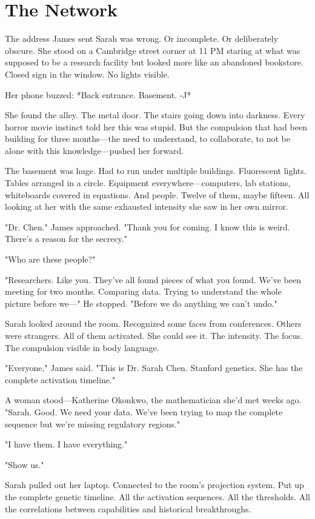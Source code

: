 \chapter{The Network}
\label{ch:20}


The address James sent Sarah was wrong. Or incomplete. Or deliberately obscure. She stood on a Cambridge street corner at 11 PM staring at what was supposed to be a research facility but looked more like an abandoned bookstore. Closed sign in the window. No lights visible.

Her phone buzzed: *Back entrance. Basement. -J*

She found the alley. The metal door. The stairs going down into darkness. Every horror movie instinct told her this was stupid. But the compulsion that had been building for three months—the need to understand, to collaborate, to not be alone with this knowledge—pushed her forward.

The basement was huge. Had to run under multiple buildings. Fluorescent lights. Tables arranged in a circle. Equipment everywhere—computers, lab stations, whiteboards covered in equations. And people. Twelve of them, maybe fifteen. All looking at her with the same exhausted intensity she saw in her own mirror.

"Dr. Chen." James approached. "Thank you for coming. I know this is weird. There's a reason for the secrecy."

"Who are these people?"

"Researchers. Like you. They've all found pieces of what you found. We've been meeting for two months. Comparing data. Trying to understand the whole picture before we—" He stopped. "Before we do anything we can't undo."

Sarah looked around the room. Recognized some faces from conferences. Others were strangers. All of them activated. She could see it. The intensity. The focus. The compulsion visible in body language.

"Everyone," James said. "This is Dr. Sarah Chen. Stanford genetics. She has the complete activation timeline."

A woman stood—Katherine Okonkwo, the mathematician she'd met weeks ago. "Sarah. Good. We need your data. We've been trying to map the complete sequence but we're missing regulatory regions."

"I have them. I have everything."

"Show us."

Sarah pulled out her laptop. Connected to the room's projection system. Put up the complete genetic timeline. All the activation sequences. All the thresholds. All the correlations between capabilities and historical breakthroughs.

